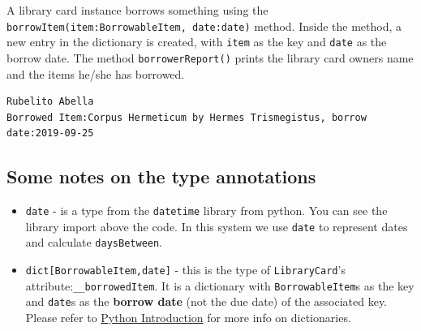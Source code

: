 \begin{Shaded}
\begin{Highlighting}[]
\OperatorTok{=}\NormalTok{,}\NormalTok{,\{\})}
\end{Highlighting}
\end{Shaded}

A library card instance borrows something using the
\texttt{borrowItem(item:BorrowableItem,\ date:date)} method. Inside the
method, a new entry in the dictionary is created, with \texttt{item} as
the key and \texttt{date} as the borrow date. The method
\texttt{borrowerReport()} prints the library card owners name and the
items he/she has borrowed.

\begin{Shaded}
\begin{Highlighting}[]
\NormalTok{,}\NormalTok{,}\NormalTok{))}
\end{Highlighting}
\end{Shaded}

\begin{verbatim}
Rubelito Abella
Borrowed Item:Corpus Hermeticum by Hermes Trismegistus, borrow date:2019-09-25
\end{verbatim}

\subsection{Some notes on the type
annotations}\label{lab-exercise-6-borrowing-from-the-library.md__some-notes-on-the-type-annotations}

\begin{itemize}
\tightlist
\item
  \texttt{date} - is a type from the \texttt{datetime} library from
  python. You can see the library import above the code. In this system
  we use \texttt{date} to represent dates and calculate
  \texttt{daysBetween}.
\item
  \texttt{dict{[}BorrowableItem,date{]}} - this is the type of
  \texttt{LibraryCard}'s attribute:\texttt{\_\_borrowedItem}. It is a
  dictionary with \texttt{BorrowableItem}s as the key and \texttt{date}s
  as the \textbf{borrow date} (not the due date) of the associated key.
  Please refer to \href{https://hackmd.io/@RubAbella/Syz0e_k8B}{Python
  Introduction} for more info on dictionaries.
\end{itemize}

